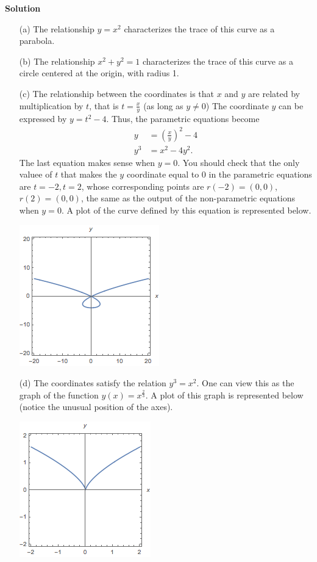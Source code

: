 \documentclass[12pt,oneside]{exam}
\newenvironment{newsolution}{\vspace{.1in}\noindent\textbf{Solution \hspace{.05em}}}{}
\begin{document}
\begin{newsolution}
\begin{itemize}
\item[(a)] The relationship $y=x^2$ characterizes the trace of this curve as a parabola. 
\item[(b)] The relationship $x^2+y^2 = 1$ characterizes the trace of this curve as a circle centered at the origin, with radius 1. 
\item[(c)] The relationship between the coordinates is that  $x$ and $y$ are related by multiplication by $t$, that is $t=\frac{x}{y}$ (as long as $y \neq 0$) The coordinate $y$ can be expressed by $y=t^2-4$. Thus, the parametric equations become
\begin{align*}
y & =\left(\frac{x}{y}\right)^2 -4\\
y^3 & = x^2 -4y^2.
\end{align*}
The last equation makes sense when $y=0$. You should check that the only valuee of $t$ that makes the $y$ coordinate equal to $0$ in the parametric equations are $t=-2,t=2$, whose corresponding points are $r(-2)=(0,0)$, $r(2)=(0,0)$, the same as the output of the non-parametric equations when $y=0$. A plot of the curve defined by this equation is represented below.
\begin{center}
\includegraphics{hw2_plot1c.png}
\end{center}
\item[(d)] The coordinates satisfy the relation $y^3=x^2$. One can view this as the graph of the function $y(x)=x^{\frac{2}{3}}$. A plot of this graph is represented below (notice the unusual position of the axes). 
\begin{center}
\includegraphics{hw2_plot1d.png}

\end{center}
\end{itemize}
\end{newsolution}
\end{document}
